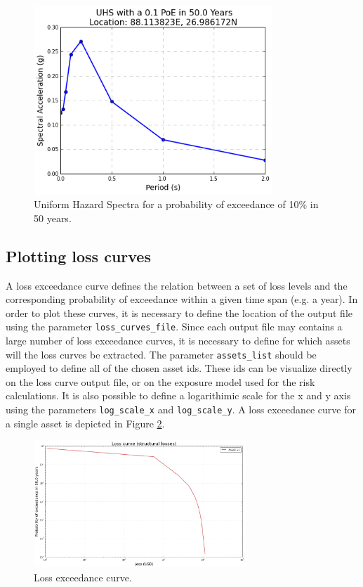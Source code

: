 \begin{figure}[htb]
  \centering
      \includegraphics[width=9cm]{figures/UHS.png}
  \caption{Uniform Hazard Spectra for a probability of exceedance of 10\% in 50 years.}
  \label{fig:UHS}
\end{figure}

\subsection{Plotting loss curves}
\label{subsec:plot-loss_curves}
A loss exceedance curve defines the relation between a set of loss levels and the corresponding probability of exceedance within a given time span (e.g. a year). In order to plot these curves, it is necessary to define the location of the output file using the parameter \verb=loss_curves_file=. Since each output file may contains a large number of loss exceedance curves, it is necessary to define for which assets will the loss curves be extracted. The parameter \verb=assets_list= should be employed to define all of the chosen asset ids. These ids can be visualize directly on the loss curve output file, or on the exposure model used for the risk calculations. It is also possible to define a logarithimic scale for the x and y axis using the parameters \verb=log_scale_x= and \verb=log_scale_y=. A loss exceedance curve for a single asset is depicted in Figure \ref{fig:loss_curve}.

\begin{figure}[htb]
  \centering
      \includegraphics[width=8cm]{figures/loss_curve.png}
  \caption{Loss exceedance curve.}
  \label{fig:loss_curve}
\end{figure}